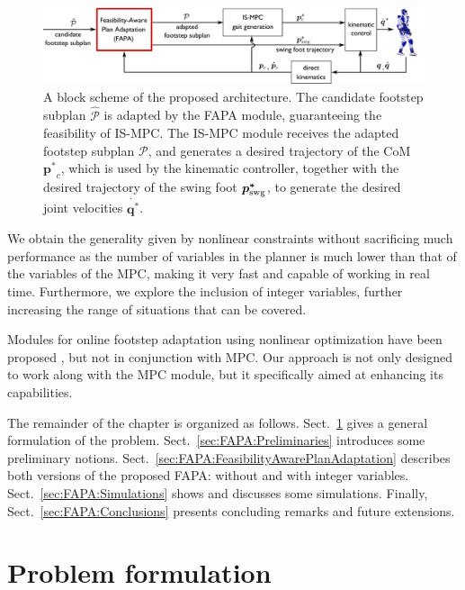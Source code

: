 \begin{figure}
\centering\includegraphics[width=\textwidth]{figures/BlockScheme-NLP-STA.pdf}
\caption{A block scheme of the proposed architecture. The candidate footstep subplan $\mathcal{\hat{P}}$ is adapted by the FAPA module, guaranteeing the feasibility of IS-MPC. The IS-MPC module receives the adapted footstep subplan $\mathcal{P}$, and generates a desired trajectory of the CoM $\bm{p^*}_c$, which is used by the kinematic controller, together with the desired trajectory of the swing foot $\bm{p^*}_{\rm swg}$, to generate the desired joint velocities $\dot{\bm{q^*}}$.}
\label{fig:FAPA:block_scheme}
\end{figure}

We obtain the generality given by nonlinear constraints without sacrificing much performance as the number of variables in the planner is much lower than that of the variables of the MPC, making it very fast and capable of working in real time. Furthermore, we explore the inclusion of integer variables, further increasing the range of situations that can be covered.

Modules for online footstep adaptation using nonlinear optimization have been proposed \cite{Ding2019IROS}, but not in conjunction with MPC. Our approach is not only designed to work along with the MPC module, but it specifically aimed at enhancing its capabilities.

The remainder of the chapter is organized as follows. Sect.~\ref{sec:FAPA:ProblemFormulation} gives a general formulation of the problem. Sect.~\ref{sec:FAPA:Preliminaries} introduces some preliminary notions. Sect.~\ref{sec:FAPA:FeasibilityAwarePlanAdaptation} describes both versions of the proposed FAPA: without and with integer variables. Sect.~\ref{sec:FAPA:Simulations} shows and discusses some simulations. Finally, Sect.~\ref{sec:FAPA:Conclusions} presents concluding remarks and future extensions.

\section{Problem formulation} 
\label{sec:FAPA:ProblemFormulation}



